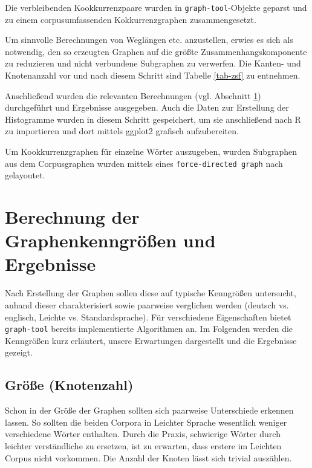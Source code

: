 \documentclass[11pt, a4paper]{article}
\begin{document}
Die verbleibenden Kookkurrenzpaare wurden in \texttt{graph-tool}-Objekte geparst
und zu einem corpusumfassenden Kokkurrenzgraphen zusammengesetzt.

Um sinnvolle Berechnungen von Weglängen etc. anzustellen, erwies es sich als
notwendig, den so erzeugten Graphen auf die größte Zusammenhangskomponente zu
reduzieren und nicht verbundene Subgraphen zu verwerfen.
Die Kanten- und Knotenanzahl vor und nach diesem Schritt sind Tabelle
\ref{tab-zsf} zu entnehmen.

Anschließend wurden die relevanten Berechnungen (vgl. Abschnitt
\ref{berechnung-ergebnisse}) durchgeführt und Ergebnisse ausgegeben.
Auch die Daten zur Erstellung der Histogramme wurden in diesem Schritt
gespeichert, um sie anschließend nach R zu importieren und dort mittels ggplot2
grafisch aufzubereiten.

Um Kookkurrenzgraphen für einzelne Wörter auszugeben, wurden Subgraphen aus dem
Corpusgraphen wurden mittels eines \texttt{force-directed graph} nach
\cite{Hu2006} gelayoutet.


\section{Berechnung der Graphenkenngr\"o\ss{}en und Ergebnisse}
\label{berechnung-ergebnisse}

Nach Erstellung der Graphen sollen diese auf typische Kenngrößen untersucht,
anhand dieser charakterisiert sowie paarweise verglichen werden (deutsch vs.
englisch, Leichte vs. Standardsprache).
Für verschiedene Eigenschaften bietet \texttt{graph-tool} bereits implementierte
Algorithmen an. Im Folgenden werden die Kenngrößen kurz erläutert, unsere
Erwartungen dargestellt und die Ergebnisse gezeigt.

\subsection{Gr\"o\ss{}e (Knotenzahl)}
\label{groesse-knotenzahl}

Schon in der Größe der Graphen sollten sich paarweise Unterschiede erkennen
lassen. So sollten die beiden Corpora in Leichter Sprache wesentlich weniger
verschiedene Wörter enthalten. Durch die Praxis, schwierige Wörter
durch leichter verständliche zu ersetzen, ist zu erwarten, dass erstere im
Leichten Corpus nicht vorkommen. Die Anzahl der Knoten lässt sich trivial
auszählen.
\end{document}
